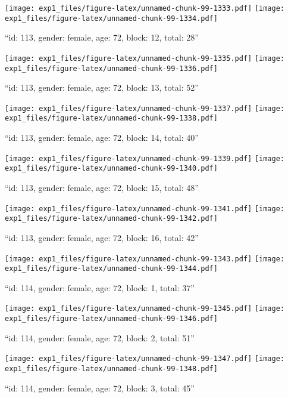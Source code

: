 \documentclass[,]{article}
\begin{document}
\texttt{[image: exp1\_files/figure-latex/unnamed-chunk-99-1333.pdf]}
\texttt{[image: exp1\_files/figure-latex/unnamed-chunk-99-1334.pdf]}

\newpage
[1] 

``id: 113, gender: female, age: 72, block: 12, total: 28''

\texttt{[image: exp1\_files/figure-latex/unnamed-chunk-99-1335.pdf]}
\texttt{[image: exp1\_files/figure-latex/unnamed-chunk-99-1336.pdf]}

\newpage
[1] 

``id: 113, gender: female, age: 72, block: 13, total: 52''

\texttt{[image: exp1\_files/figure-latex/unnamed-chunk-99-1337.pdf]}
\texttt{[image: exp1\_files/figure-latex/unnamed-chunk-99-1338.pdf]}

\newpage
[1] 

``id: 113, gender: female, age: 72, block: 14, total: 40''

\texttt{[image: exp1\_files/figure-latex/unnamed-chunk-99-1339.pdf]}
\texttt{[image: exp1\_files/figure-latex/unnamed-chunk-99-1340.pdf]}

\newpage
[1] 

``id: 113, gender: female, age: 72, block: 15, total: 48''

\texttt{[image: exp1\_files/figure-latex/unnamed-chunk-99-1341.pdf]}
\texttt{[image: exp1\_files/figure-latex/unnamed-chunk-99-1342.pdf]}

\newpage
[1] 

``id: 113, gender: female, age: 72, block: 16, total: 42''

\texttt{[image: exp1\_files/figure-latex/unnamed-chunk-99-1343.pdf]}
\texttt{[image: exp1\_files/figure-latex/unnamed-chunk-99-1344.pdf]}

\newpage
[1] 

``id: 114, gender: female, age: 72, block: 1, total: 37''

\texttt{[image: exp1\_files/figure-latex/unnamed-chunk-99-1345.pdf]}
\texttt{[image: exp1\_files/figure-latex/unnamed-chunk-99-1346.pdf]}

\newpage
[1] 

``id: 114, gender: female, age: 72, block: 2, total: 51''

\texttt{[image: exp1\_files/figure-latex/unnamed-chunk-99-1347.pdf]}
\texttt{[image: exp1\_files/figure-latex/unnamed-chunk-99-1348.pdf]}

\newpage
[1] 

``id: 114, gender: female, age: 72, block: 3, total: 45''
\end{document}
